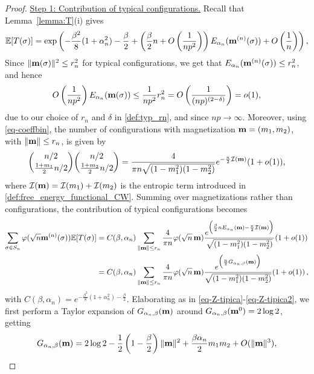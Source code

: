 \documentclass[11pt,oneside]{amsart}
\numberwithin{equation}{section}  %
\theoremstyle{plain}
\theoremstyle{remark}
\def \E {{\mathbb E}}
\def \s {{\sigma}}
\def \bm {{\bf m}}
\begin{document}
\begin{proof}
\noindent
\underline{Step 1: Contribution of typical configurations.} Recall that Lemma~\ref{lemma:T}(i) gives
\[
\E[T(\sigma)] = \exp \left(- \frac{\beta^2}{8} (1+\alpha_n^2) -\frac{\beta}{2}+ \left(\frac{\beta}{2}n+O\left(\frac{1}{np^2}\right)\right) E_{\alpha_n}(\bm^{(n)}(\s)) +O \left (\frac{1}{n}\right ) \right ) ,
\]
Since $\|\bm(\sigma)\|^2 \le r_n^2$ for typical configurations, we get 
that $E_{\alpha_n}(\bm^{(n)}(\sigma)) \le r_n^2$, and hence
\begin{equation*}
O\left(\frac{1}{n p^2}\right) E_{\alpha_n}(\bm(\sigma)) \le  \frac{1}{n p^2}  r_n^2
= O\left( \frac{1}{(np)^{(2-\delta)}} \right) = o(1),
\end{equation*}
due to our choice of  $r_n$ and $\delta$ in \eqref{def:typ_rn}, and since $n p \to \infty$.
Moreover, using \eqref{eq-coeffbin}, the number of configurations with magnetization 
$\bm=(m_1,m_2)$, with $\|\bm\|\le r_n$, is given by
\begin{equation}
\label{eq:doublebinom}
  \binom{n/2}{\frac{1+m_1}{2} n/2} \binom{n/2}{\frac{1+m_2}{2} n/2}= 
   \frac{4}{\pi n\sqrt{(1-m_1^2)(1-m_2^2)}}e^{- \frac{n}{2}\mathcal{I}(\bm)}(1+o(1)),
\end{equation}
where $\mathcal{I}(\bm)=\mathcal{I}(m_1)+\mathcal{I}(m_2)$ is the entropic term introduced in \eqref{def:free_energy_functional_CW}.
Summing over magnetizations rather than configurations, the contribution of typical configurations becomes
\begin{equation}
\label{eq:typical_sum}
\begin{split} 
\sum_{\sigma \in S_n} \varphi(\sqrt{n} \bm^{(n)}(\sigma)) \E[T(\sigma)] &=C(\beta,\alpha_n)
\sum_{\substack{ \|\bm\|\le r_n}}
\frac{4}{\pi n}\varphi(\sqrt{n}\, \bm) \frac{e^{\Big( \frac{\beta}{2} n E_{\alpha_n}(\bm) -\frac{n}{2} \mathcal{I}(\bm) \Big)}}{\sqrt{(1-m_1^2)(1-m_2^2)}}
(1+o(1))\\
&= C(\beta,\alpha_n) \sum_{\substack{ \|\bm\|\le r_n}}
\frac{4}{\pi n}\varphi(\sqrt{n}\, \bm) \frac{e^{\Big( \frac{n}{2} G_{\alpha_n, \beta}(\bm)\Big)}}{\sqrt{(1-m_1^2)(1-m_2^2)}}(1+o(1))\,,
\end{split}
\end{equation}
with $C(\beta,\alpha_n)=e^{- \frac{\beta^2}{8} (1+\alpha_n^2) -\frac{\beta}{2}}$.
Elaborating as in \eqref{eq-Z-tipica}-\eqref{eq-Z-tipica2}, we first perform a Taylor expansion of $G_{\alpha_n,\beta}(\bm)$ around $G_{\alpha_n,\beta}(\bm^0)=2\log2$, getting 
\begin{align}\label{eq:G-sviluppo}
    G_{\alpha_n,\beta}(\bm)=2\log2-\frac{1}{2} \left ( 1-\frac{\beta}{2} \right ) \|\bm\|^2 +\frac{\beta \alpha_n}{2}m_1 m_2+ O(\|\bm\|^3),

\end{align}
\end{proof}
\end{document}
